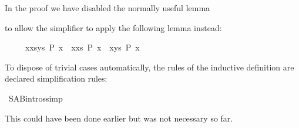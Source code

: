 \begin{isabellebody}
%
\begin{isamarkuptext}%
\noindent
In the proof we have disabled the normally useful lemma
\begin{isabelle}
\end{isabelle}
to allow the simplifier to apply the following lemma instead:
\begin{isabelle}%
\ \ \ \ \ {}x{}xs{}ys{}\ P\ x{}\ {}\ {}x{}xs{}\ P\ x{}\ {}\ {}x{}ys{}\ P\ x{}%
\end{isabelle}

To dispose of trivial cases automatically, the rules of the inductive
definition are declared simplification rules:%
\end{isamarkuptext}%
\isamarkuptrue%
\isamarkupfalse%
\ S{}A{}B{}intros{}simp{}%
\begin{isamarkuptext}%
\noindent
This could have been done earlier but was not necessary so far.


\end{isamarkuptext}
\end{isabellebody}
